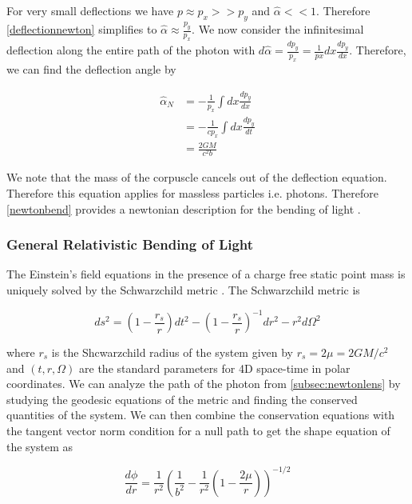 \par For very small deflections we have $p\approx p_x >> p_y$ and $\hat{\alpha} << 1$. 
Therefore \autoref{deflectionnewton} simplifies to $\hat{\alpha}
\approx \frac{p_y}{p_x}$. We now consider the infinitesimal deflection along the entire path of the photon with
$d\hat{\alpha} = \frac{dp_y}{p_x} = \frac{1}{px} dx \frac{dp_y}{dx}$. Therefore, we can find the deflection
angle by 

\begin{equation}
  \begin{split}
  \hat{\alpha}_N &= -\frac{1}{p_x} \int dx \frac{dp_y}{dx} \\
  &= -\frac{1}{cp_x} \int dx \frac{dp_y}{dt}  \\ 
  &= \frac{2GM}{c^2b}
  \end{split}  
  \label{newtonbend}
\end{equation}

We note that the mass of the corpuscle cancels out of the deflection equation. Therefore this equation applies
for massless particles i.e. photons. Therefore \autoref{newtonbend} provides a newtonian description for the 
bending of light \cite{lensingbook}.

\subsubsection{General Relativistic Bending of Light}
The Einstein's field equations in the presence of a charge free static point mass is uniquely solved by 
the Schwarzchild metric \cite{GR1}. The Schwarzchild metric is

\begin{equation}
  ds^2 = \left ( 1-\frac{r_s}{r} \right )  dt^2 - \left( 1-\frac{r_s}{r}\right) ^{-1} dr^2 -r^2 d\Omega^2
  \label{schwarz}
\end{equation}

where $r_s$ is the Shcwarzchild radius of the system given by $r_s=2 \mu = 2GM/c^2$ and $(t,r,\Omega)$ are the standard parameters for 4D space-time in polar coordinates. We can analyze the path of the photon from \autoref{subsec:newtonlens} by studying the geodesic equations of the metric and finding the conserved
quantities of the system. We can then combine the conservation equations with the tangent vector norm condition for a 
null path to get the shape equation of the system as 

\begin{equation}
  \frac{d\phi}{dr} = \frac{1}{r^2} \left(\frac{1}{b^2}- \frac{1}{r^2} \left(1-\frac{2\mu}{r}\right) \right)^{-1/2}
  \label{shapeeqbend}
\end{equation}

